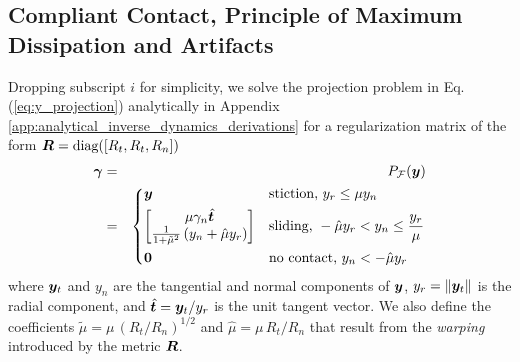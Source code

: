 
\subsection{Compliant Contact, Principle of Maximum Dissipation and Artifacts}
\label{sec:physical_intuition}

Dropping subscript $i$ for simplicity, we solve the projection problem in Eq.
(\ref{eq:y_projection}) analytically in Appendix
\ref{app:analytical_inverse_dynamics_derivations} for a regularization matrix of
the form ${\bm{R}} = \text{diag}([R_t, R_t, R_n])$
\begin{eqnarray}
	\bgamma &=& P_\mathcal{F}(\vf{y}) \label{eq:analytical_y_projection}\\
    &=&\begin{dcases}
	\vf{y} 
	& \text{stiction, } y_r \le \mu y_n\\
	\begin{bmatrix}
		\mu\gamma_n\hat{\vf{t}}\\
		\frac{1}{1+\tilde\mu^2}\left(y_n + \hat\mu y_r\right)
	\end{bmatrix}
	& \text{sliding, } -\hat\mu y_r < y_n \leq \frac{y_r}{\mu}\\
    \vf{0} & \text{no contact, } y_n < -\hat\mu y_r \end{dcases}\nonumber	
\end{eqnarray}
where ${\bm{y}}_t$ and $y_n$ are the tangential and normal components of ${\bm{y}}$,
$y_r=\Vert{\bm{y}}_t\Vert$ is the radial component, and
$\hat{{\bm{t}}}={\bm{y}}_t/y_r$ is the unit tangent vector. We also define the
coefficients $\tilde\mu=\mu\,(R_t/R_n)^{1/2}$ and $\hat\mu=\mu\,R_t/R_n$ that
result from the \textit{warping} introduced by the metric ${\bm{R}}$.

